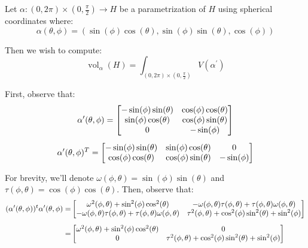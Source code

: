 \documentclass{article}
\begin{document}
\begin{soln}[source=Alan]
    Let $\alpha : (0, 2\pi) \times (0, \frac{\pi}{2}) \rightarrow H$ be a parametrization of $H$
    using spherical coordinates where:
$$
\alpha(\theta, \phi) = (\sin(\phi)\cos(\theta), \sin(\phi)\sin(\theta), \cos(\phi))
$$

Then we wish to compute:
$$
\operatorname{vol}_\alpha(H) = \int_{(0, 2\pi) \times (0, \frac{\pi}{2})} V(\alpha^\prime)
$$

First, observe that:
\begin{gather*}
\alpha^\prime(\theta, \phi) = \begin{bmatrix}
-\sin(\phi)\sin(\theta) & \cos(\phi)\cos(\theta) \\
\sin(\phi)\cos(\theta) & \cos(\phi)\sin(\theta) \\
0 & -\sin(\phi)
\end{bmatrix} \vsp
\alpha^\prime(\theta, \phi)^T = \begin{bmatrix}
-\sin(\phi)\sin(\theta) & \sin(\phi)\cos(\theta) & 0 \\
\cos(\phi)\cos(\theta)  & \cos(\phi)\sin(\theta) & -\sin(\phi)
\end{bmatrix}
\end{gather*}

For brevity, we'll denote $ \omega(\phi, \theta) = \sin(\phi)\sin(\theta) $
and $ \tau(\phi, \theta) = \cos(\phi)\cos(\theta) $.
Then, observe that:
\begin{align*}
    (\alpha^\prime(\theta, \phi))^t\alpha^\prime(\theta, \phi) = &
\begin{bmatrix}
\omega^{2}(\phi, \theta) + \sin^2(\phi)\cos^2(\theta) & -\omega(\phi, \theta)\tau(\phi, \theta)
+ \tau(\phi, \theta)\omega(\phi, \theta) \\ 
-\omega(\phi, \theta)\tau(\phi, \theta) + \tau(\phi, \theta)\omega(\phi, \theta) &
\tau^{2}(\phi, \theta) + \cos^2(\phi)\sin^2(\theta) + \sin^2(\phi) \\
\end{bmatrix} \vsp
    = & 
\begin{bmatrix}
\omega^{2}(\phi, \theta) + \sin^2(\phi)\cos^2(\theta) & 0 \\ 
0 & \tau^{2}(\phi, \theta) + \cos^2(\phi)\sin^2(\theta) + \sin^2(\phi) \\
\end{bmatrix}
\end{align*}


\end{soln}
\end{document}
